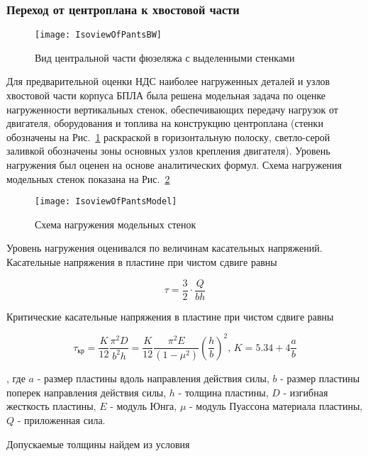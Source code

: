  \subsubsection{Переход от центроплана к хвостовой части} 

\begin{figure}[h]
\centering
\texttt{[image: IsoviewOfPantsBW]}
\caption{Вид центральной части фюзеляжа с выделенными стенками}
\label{IsoviewOfPants}
\end{figure}

Для предварительной оценки НДС наиболее нагруженных деталей и узлов хвостовой части корпуса БПЛА была решена модельная задача по оценке нагруженности вертикальных стенок, обеспечивающих передачу нагрузок от двигателя, оборудования и топлива на конструкцию центроплана (стенки обозначены на Рис.~\ref{IsoviewOfPants} раскраской в горизонтальную полоску, светло-серой заливкой обозначены зоны основных узлов крепления двигателя). Уровень нагружения был оценен на основе аналитических формул. Схема нагружения модельных стенок показана на Рис.~\ref{IsoviewOfPantsModel}

\begin{figure}[h]
\centering
\texttt{[image: IsoviewOfPantsModel]}
\caption{Схема нагружения модельных стенок}
\label{IsoviewOfPantsModel}
\end{figure}


Уровень нагружения оценивался по величинам касательных напряжений. Касательные напряжения в пластине при чистом сдвиге равны

\begin{equation}
\tau=\frac{3}{2}\cdot\frac{Q}{bh}
\end{equation}

Критические касательные напряжения в пластине при чистом сдвиге равны

\begin{equation}
\tau_\text{кр}=\frac{K}{12}\frac{\pi^2D}{b^2h} = \frac{K}{12}\frac{\pi^2E}{(1-\mu^2)}\left(\frac{h}{b}\right)^2,\, K=5.34 + 4\frac{a}{b}
\end{equation}

, где $a$ - размер пластины вдоль направления действия силы, $b$ - размер пластины поперек направления действия силы, $h$ - толщина пластины, $D$ - изгибная жесткость пластины, $E$ - модуль Юнга, $\mu$ - модуль Пуассона материала пластины, $Q$ - приложенная сила.

Допускаемые толщины найдем из условия

